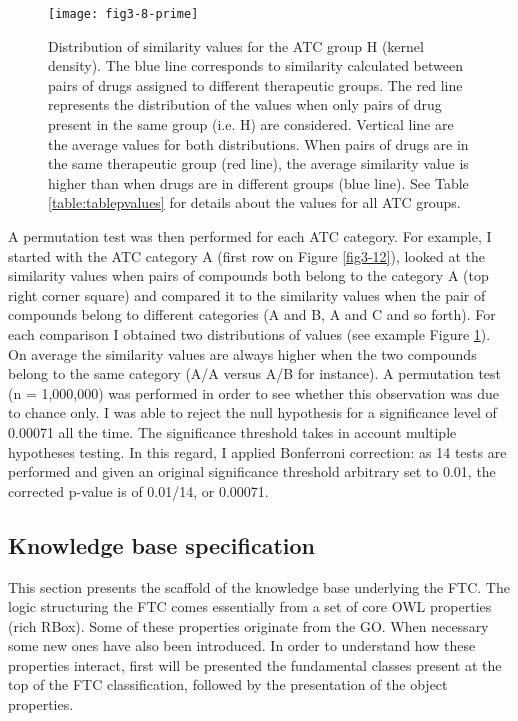 \begin{figure}[ht]
    \centering
    \texttt{[image: fig3-8-prime]}
    \caption{Distribution of similarity values for the ATC group H (kernel density). The blue line corresponds to similarity calculated between pairs of drugs assigned to different therapeutic groups. The red line represents the distribution of the values when only pairs of drug present in the same group (i.e. H) are considered. Vertical line are the average values for both distributions. When pairs of drugs are in the same therapeutic group (red line), the average similarity value is higher than when drugs are in different groups (blue line). See Table \ref{table:tablepvalues} for details about the values for all ATC groups.}
    \label{fig3-8-prime}
\end{figure}

A permutation test was then performed for each ATC category. For example, I started with the ATC category A (first row on Figure \ref{fig3-12}), looked at the similarity values when pairs of compounds both belong to the category A (top right corner square) and compared it to the similarity values when the pair of compounds belong to different categories (A and B, A and C and so forth). For each comparison I obtained two distributions of values (see example Figure \ref{fig3-8-prime}). On average the similarity values are always higher when the two compounds belong to the same category (A/A versus A/B for instance). A permutation test (n = 1,000,000) was performed in order to see whether this observation was due to chance only. I was able to reject the null hypothesis for a significance level of 0.00071 all the time.
The significance threshold takes in account multiple hypotheses testing. In this regard, I applied Bonferroni correction: as 14 tests are performed and given an original significance threshold arbitrary set to 0.01, the corrected p-value is of 0.01/14, or 0.00071.

\subsection{Knowledge base specification}
\label{specskb}

This section presents the scaffold of the knowledge base underlying the FTC. The logic structuring the FTC comes essentially from a set of core OWL properties (rich RBox). Some of these properties originate from the GO. When necessary some new ones have also been introduced. In order to understand how these properties interact, first will be presented the fundamental classes present at the top of the FTC classification, followed by the presentation of the object properties.

